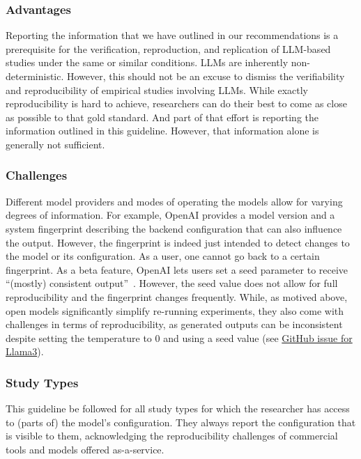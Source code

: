 \subsubsection{Advantages}

Reporting the information that we have outlined in our recommendations is a prerequisite for the verification, reproduction, and replication of LLM-based studies under the same or similar conditions.
LLMs are inherently non-deterministic. 
However, this should not be an excuse to dismiss the verifiability and reproducibility of empirical studies involving LLMs.
While exactly reproducibility is hard to achieve, researchers can do their best to come as close as possible to that gold standard.
And part of that effort is reporting the information outlined in this guideline. 
However, that information alone is generally not sufficient.

\subsubsection{Challenges}

Different model providers and modes of operating the models allow for varying degrees of information.
For example, OpenAI provides a model version and a system fingerprint describing the backend configuration that can also influence the output.
However, the fingerprint is indeed just intended to detect changes to the model or its configuration.
As a user, one cannot go back to a certain fingerprint.
As a beta feature, OpenAI lets users set a seed parameter to receive ``(mostly) consistent output''~\cite{OpenAI23}.
However, the seed value does not allow for full reproducibility and the fingerprint changes frequently. 
While, as motived above, open models significantly simplify re-running experiments, they also come with challenges in terms of reproducibility, as generated outputs can be inconsistent despite setting the temperature to 0 and using a seed value (see \href{https://github.com/ollama/ollama/issues/5321}{GitHub issue for Llama3}).


\subsubsection{Study Types}

This guideline \must be followed for all study types for which the researcher has access to (parts of) the model's configuration.
They \must always report the configuration that is visible to them, acknowledging the reproducibility challenges of commercial tools and models offered as-a-service. 

